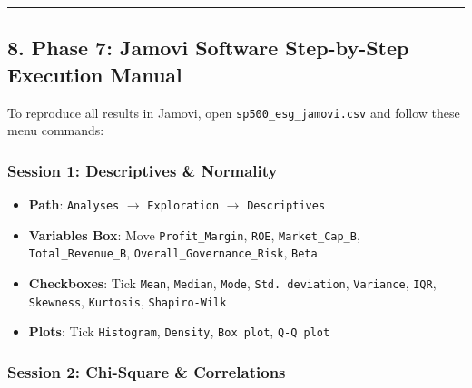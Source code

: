 \documentclass[
]{article}
\providecommand{\tightlist}{%
  \setlength{\itemsep}{0pt}\setlength{\parskip}{0pt}}
\begin{document}
\begin{center}\rule{0.5\linewidth}{0.5pt}\end{center}

\subsection{8. Phase 7: Jamovi Software Step-by-Step Execution
Manual}\label{phase-7-jamovi-software-step-by-step-execution-manual}

To reproduce all results in Jamovi, open \texttt{sp500\_esg\_jamovi.csv}
and follow these menu commands:

\subsubsection{Session 1: Descriptives \&
Normality}\label{session-1-descriptives-normality}

\begin{itemize}
\tightlist
\item
  \textbf{Path}: \texttt{Analyses} \(\rightarrow\) \texttt{Exploration}
  \(\rightarrow\) \texttt{Descriptives}
\item
  \textbf{Variables Box}: Move \texttt{Profit\_Margin}, \texttt{ROE},
  \texttt{Market\_Cap\_B}, \texttt{Total\_Revenue\_B},
  \texttt{Overall\_Governance\_Risk}, \texttt{Beta}
\item
  \textbf{Checkboxes}: Tick \texttt{Mean}, \texttt{Median},
  \texttt{Mode}, \texttt{Std.\ deviation}, \texttt{Variance},
  \texttt{IQR}, \texttt{Skewness}, \texttt{Kurtosis},
  \texttt{Shapiro-Wilk}
\item
  \textbf{Plots}: Tick \texttt{Histogram}, \texttt{Density},
  \texttt{Box\ plot}, \texttt{Q-Q\ plot}
\end{itemize}

\subsubsection{Session 2: Chi-Square \&
Correlations}\label{session-2-chi-square-correlations}
\end{document}
